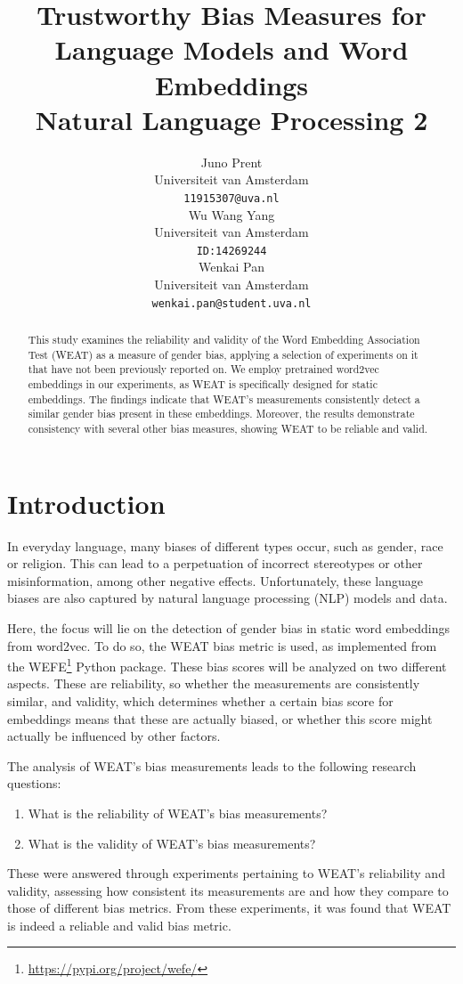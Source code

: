\documentclass[11pt]{article}
\title{Trustworthy Bias Measures for Language Models and Word Embeddings\\Natural Language Processing 2}
\author{Juno Prent \\
  Universiteit van Amsterdam \\
  \texttt{11915307@uva.nl} \\\And
  Wu Wang Yang \\
  Universiteit van Amsterdam\\
  \texttt{ID:14269244} \\\And
  Wenkai Pan \\
  Universiteit van Amsterdam \\
  \texttt{wenkai.pan@student.uva.nl}}
\begin{document}
\maketitle

\begin{abstract}
This study examines the reliability and validity of the Word Embedding Association Test (WEAT) as a measure of gender bias, applying a selection of experiments on it that have not been previously reported on. We employ pretrained word2vec embeddings in our experiments, as WEAT is specifically designed for static embeddings. The findings indicate that WEAT's measurements consistently detect a similar gender bias present in these embeddings. Moreover, the results demonstrate consistency with several other bias measures, showing WEAT to be reliable and valid.
\end{abstract}

\section{Introduction}
In everyday language, many biases of different types occur, such as gender, race or religion. This can lead to a perpetuation of incorrect stereotypes or other misinformation, among other negative effects. Unfortunately, these language biases are also captured by natural language processing (NLP) models and data. 

Here, the focus will lie on the detection of gender bias in static word embeddings from word2vec\cite{word2vec}. To do so, the WEAT\cite{weat} bias metric is used, as implemented from the WEFE\footnote{\url{https://pypi.org/project/wefe/}} Python package. These bias scores will be analyzed on two different aspects. These are reliability, so whether the measurements are consistently similar, and validity, which determines whether a certain bias score for embeddings means that these are actually biased, or whether this score might actually be influenced by other factors.

The analysis of WEAT's bias measurements leads to the following research questions:
\begin{enumerate}
    \itemsep-0.5em
    \item What is the reliability of WEAT's bias measurements?
    \item What is the validity of WEAT's bias measurements?
\end{enumerate}

These were answered through experiments pertaining to WEAT's reliability and validity, assessing how consistent its measurements are and how they compare to those of different bias metrics. From these experiments, it was found that WEAT is indeed a reliable and valid bias metric.
\end{document}
